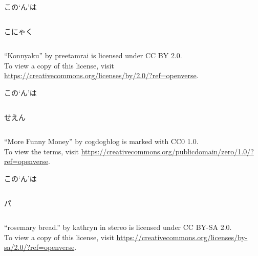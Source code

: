 \documentclass[aspectratio=169,xcolor={dvipsnames,table}]{beamer}
\begin{document}
\begin{frame}[plain]{この`ん'は}
\begin{columns}\Huge
 \begin{column}{.4\textwidth}
 こにゃく

\hspace{18pt}\textipa{/\textltailn /}
 \end{column}
\begin{column}{.575\textwidth}
\end{column}
\end{columns}
\raggedleft
{\tiny ``Konnyaku'' by preetamrai is licensed under CC BY 2.0.}\\[-5pt]
{\tiny To view a copy of this license, visit \url{https://creativecommons.org/licenses/by/2.0/?ref=openverse}.}
\end{frame}
\begin{frame}[plain]{この`ん'は}
 \begin{columns}
 \begin{column}{.35\textwidth}
{\Huge せえん}

\hspace{40pt}{\small 鼻母音}
 \end{column}
\begin{column}{.575\textwidth}
\end{column}
\end{columns}
\raggedleft
{\tiny ``More Funny Money'' by cogdogblog is marked with CC0 1.0.}\\[-5pt]
{\tiny To view the terms, visit \url{https://creativecommons.org/publicdomain/zero/1.0/?ref=openverse}.}
\end{frame}
\begin{frame}[plain]{この`ん'は}

\begin{columns}\Huge
 \begin{column}{.3\textwidth}
 パ

\hspace{18pt}\textipa{/\textscn/}
 \end{column}
\begin{column}{.6\textwidth}
\end{column}
\end{columns}
\raggedleft
{\tiny ``rosemary bread.'' by kathryn in stereo is licensed under CC BY-SA 2.0. }\\[-5pt]
{\tiny To view a copy of this license, visit \url{https://creativecommons.org/licenses/by-sa/2.0/?ref=openverse}.}
\end{frame}
\end{document}
